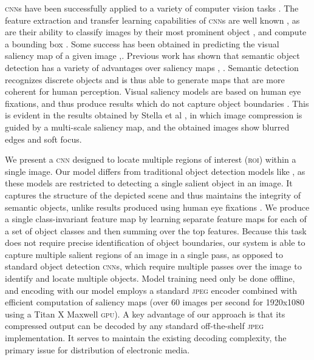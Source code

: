 \textsc{cnn}s have been successfully applied to a variety of computer vision tasks \cite{xxx_krizhevsky2012imagenet}.
The feature extraction and transfer learning capabilities of \textsc{cnn}s are well known \cite{xxx_zeiler2014visualizing}, as are their ability to classify images by their most prominent object \cite{xxx_he2015deep}, and compute a bounding box \cite{xxx_girshick2014rich}.
Some success has been obtained in predicting the visual saliency map of a given image \cite{xxx_jiang2015salicon},\cite{xxx_kummerer2014deep}.
Previous work has shown that semantic object detection has a variety of advantages over saliency maps \cite{xxx_mnih2014recurrent}, \cite{xxx_zund2013content}.
Semantic detection recognizes discrete objects and is thus able to generate maps that are more coherent for human perception.
Visual saliency models are based on human eye fixations, and thus produce results which do not capture object boundaries \cite{xxx_kummerer2014deep}.
This is evident in the results obtained by Stella et al \cite{xxx_stella2009image}, in which image compression is guided by a multi-scale saliency map, and the obtained images show blurred edges and soft focus.

We present a \textsc{cnn} designed to locate multiple regions of interest (\textsc{roi}) within a single image.
Our model differs from traditional object detection models like \cite{xxx_dai2016r}, \cite{xxx_girshick2014rich} as these models are restricted to detecting a single salient object in an image.
It captures the structure of the depicted scene and thus maintains the integrity of semantic objects, unlike results produced using human eye fixations \cite{xxx_liu2015predicting}.
We produce a single class-invariant feature map by learning separate feature maps for each of a set of object classes and then summing over the top features.
Because this task does not require precise identification of object boundaries, our system is able to capture multiple salient regions of an image in a single pass, as opposed to standard object detection \textsc{cnn}s, which require multiple passes over the image to identify and locate multiple objects.
Model training need only be done offline, and encoding with our model employs a standard \textsc{jpeg} encoder combined with efficient computation of saliency maps (over 60 images per second for 1920x1080 using a Titan X Maxwell \textsc{gpu}).
A key advantage of our approach is that its compressed output can be decoded by any standard off-the-shelf \textsc{jpeg} implementation.  It serves to maintain the existing decoding complexity, the primary issue for distribution of electronic media.


